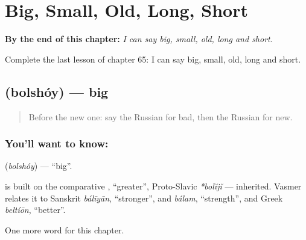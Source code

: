 
\chapter{Big, Small, Old, Long, Short}
\label{ch:ru-big-small-old-long-short}

\begin{chapteropening}
\textbf{By the end of this chapter:} \emph{I can say big, small, old, long and short.}

Complete the last lesson of chapter 65: I can say big, small, old, long and short.
\end{chapteropening}

\section[\texorpdfstring{\ru{большой} (bolshóy)}{большой (bolshóy)}]{ (bolshóy) — big}

\label{lesson:RU-C65-big}



\begin{quote}
Before the new one: say the Russian for bad, then the Russian for new.
\end{quote}

\subsection*{You'll want to know: }
\textbf{} (\emph{bolshóy}) — \textquotedblleft{}big\textquotedblright{}.

\begin{cousinweb}
\textbf{} is built on the comparative \emph{}, \textquotedblleft{}greater\textquotedblright{}, Proto-Slavic \emph{*bolĭjĭ} — inherited. Vasmer relates it to Sanskrit \emph{bálīyān}, \textquotedblleft{}stronger\textquotedblright{}, and \emph{bálam}, \textquotedblleft{}strength\textquotedblright{}, and Greek \emph{beltíōn}, \textquotedblleft{}better\textquotedblright{}.
\end{cousinweb}

\begin{grammarlens}[title={What you've built}]
One more word for this chapter.
\end{grammarlens}

